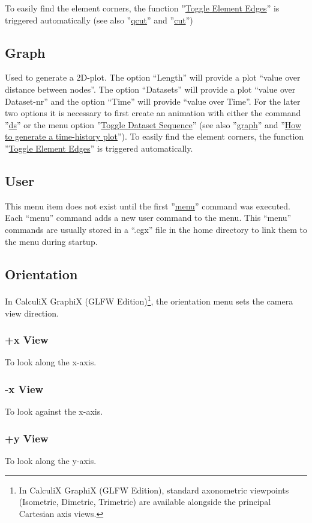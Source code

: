 \documentclass{article}
\providecommand{\htmlref}[2]{\hyperref[#2]{#1}}
\begin{document}
To easily find the element corners, the function ''\htmlref{Toggle Element Edges}{Toggle Element Edges}'' is triggered automatically (see also ''\htmlref{qcut}{qcut}'' and ''\htmlref{cut}{cut}'')

\subsection{\label{Graph}Graph}
Used to generate a 2D-plot. The option ``Length'' will provide a plot ``value over distance between nodes''. The option ``Datasets'' will provide a plot ``value over Dataset-nr'' and the option ``Time'' will provide ``value over Time''. For the later two options it is necessary to first create an animation with either the command ''\htmlref{ds}{ds}'' or the menu option ''\htmlref{Toggle Dataset Sequence}{Toggle Dataset Sequence}'' (see also ''\htmlref{graph}{graph}'' and ''\htmlref{How to generate a time-history plot}{How to generate a time-history plot}''). To easily find the element corners, the function ''\htmlref{Toggle Element Edges}{Toggle Element Edges}'' is triggered automatically.

\subsection{\label{User}User}
This menu item does not exist until the first ''\htmlref{menu}{menu}'' command was executed. Each ``menu'' command adds a new user command to the menu. This ``menu'' commands are usually stored in a ``.cgx'' file in the home directory to link them to the menu during startup.

\subsection{\label{Orientation}Orientation}
In CalculiX GraphiX (GLFW Edition)\footnote{In CalculiX GraphiX (GLFW Edition), standard axonometric viewpoints (Isometric, Dimetric, Trimetric) are available alongside the principal Cartesian axis views.}, the orientation menu sets the camera view direction.
\subsubsection{+x View}
To look along the x-axis.
\subsubsection{-x View}
To look against the x-axis.
\subsubsection{+y View}
To look along the y-axis.
\end{document}
